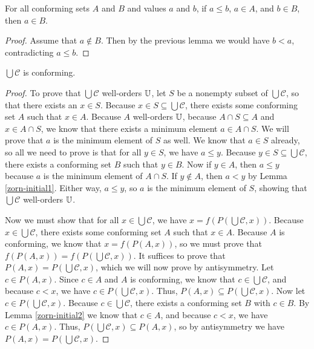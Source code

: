 \documentclass[../math.tex]{subfiles}
\begin{document}
\begin{lemma} \label{zorn-initial2}
    For all conforming sets $A$ and $B$ and values $a$ and $b$, if $a \leq b$,
    $a \in A$, and $b \in B$, then $a \in B$.
\end{lemma}
\begin{proof}
    Assume that $a \notin B$.  Then by the previous lemma we would have $b < a$,
    contradicting $a \leq b$.
\end{proof}

\begin{lemma}
    $\bigcup \mathcal C$ is conforming.
\end{lemma}
\begin{proof}
    To prove that $\bigcup \mathcal C$ well-orders $\mathbb{U}$, let $S$ be a nonempty
    subset of $\bigcup \mathcal C$, so that there exists an $x \in S$.  Because
    $x \in S \subseteq \bigcup \mathcal C$, there exists some conforming set $A$
    such that $x \in A$.  Because $A$ well-orders $\mathbb{U}$, because $A \cap S
    \subseteq A$ and $x \in A \cap S$, we know that there exists a minimum
    element $a \in A \cap S$.  We will prove that $a$ is the minimum element of
    $S$ as well.  We know that $a \in S$ already, so all we need to prove is
    that for all $y \in S$, we have $a \leq y$.  Because $y \in S \subseteq
    \bigcup \mathcal C$, there exists a conforming set $B$ such that $y \in B$.
    Now if $y \in A$, then $a \leq y$ because $a$ is the minimum element of $A
    \cap S$.  If $y \notin A$, then $a < y$ by Lemma \ref{zorn-initial1}.
    Either way, $a \leq y$, so $a$ is the minimum element of $S$, showing that
    $\bigcup \mathcal C$ well-orders $\mathbb{U}$.

    Now we must show that for all $x \in \bigcup \mathcal C$, we have $x =
    f(P(\bigcup \mathcal C, x))$.  Because $x \in \bigcup \mathcal C$, there
    exists some conforming set $A$ such that $x \in A$.  Because $A$ is
    conforming, we know that $x = f(P(A, x))$, so we must prove that $f(P(A, x))
    = f(P(\bigcup \mathcal C, x))$.  It suffices to prove that $P(A, x) =
    P(\bigcup \mathcal C, x)$, which we will now prove by antisymmetry.  Let $c
    \in P(A, x)$.  Since $c \in A$ and $A$ is conforming, we know that $c \in
    \bigcup \mathcal C$, and because $c < x$, we have $c \in P(\bigcup \mathcal
    C, x)$.  Thus, $P(A, x) \subseteq P(\bigcup \mathcal C, x)$.  Now let $c \in
    P(\bigcup \mathcal C, x)$.  Because $c \in \bigcup \mathcal C$, there exists
    a conforming set $B$ with $c \in B$.  By Lemma \ref{zorn-initial2} we know
    that $c \in A$, and because $c < x$, we have $c \in P(A, x)$.  Thus,
    $P(\bigcup \mathcal C, x) \subseteq P(A, x)$, so by antisymmetry we have
    $P(A, x) = P(\bigcup \mathcal C, x)$.
\end{proof}
\end{document}
